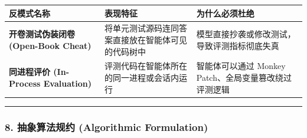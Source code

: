 {\def\LTcaptype{} %
\begin{longtable}[]{@{}
  >{\raggedright\arraybackslash}p{}
  >{\raggedright\arraybackslash}p{}
  >{\raggedright\arraybackslash}p{}@{}}
\toprule\noalign{}
\begin{minipage}[b]{\linewidth}\raggedright
反模式名称
\end{minipage} & \begin{minipage}[b]{\linewidth}\raggedright
表现特征
\end{minipage} & \begin{minipage}[b]{\linewidth}\raggedright
为什么必须杜绝
\end{minipage} \\
\midrule\noalign{}
\endhead
\bottomrule\noalign{}
\endlastfoot
\textbf{开卷测试伪装闭卷 (Open-Book Cheat)} &
将单元测试源码连同答案直接放在智能体可见的代码树中 &
模型直接抄袭或修改测试，导致评测指标彻底失真 \\
\textbf{同进程评价 (In-Process Evaluation)} &
评测代码在智能体所在的同一进程或会话内运行 & 智能体可以通过 Monkey
Patch、全局变量篡改绕过评测逻辑 \\
\end{longtable}
}

\begin{center}\rule{0.5\linewidth}{0.5pt}\end{center}

\subsubsection{8. 抽象算法规约 (Algorithmic
Formulation)}\label{ux62bdux8c61ux7b97ux6cd5ux89c4ux7ea6-algorithmic-formulation-16}

